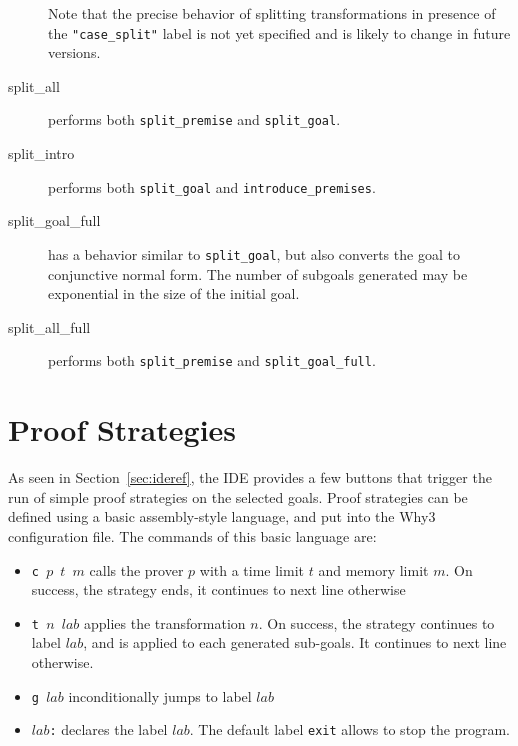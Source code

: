 \begin{description}
Note that the precise behavior of splitting transformations in presence of
the \verb|"case_split"| label is not yet specified
and is likely to change in future versions.


\item[split\_all]
  performs both \texttt{split\_premise} and \texttt{split\_goal}.

\item[split\_intro]
  performs both \texttt{split\_goal} and \texttt{introduce\_premises}.

\item[split\_goal\_full]
  has a behavior similar
  to \texttt{split\_goal}, but also converts the goal to conjunctive normal form.
  The number of subgoals generated may be exponential in the size of the initial goal.

\item[split\_all\_full]
  performs both \texttt{split\_premise} and \texttt{split\_goal\_full}.


\end{description}


\section{Proof Strategies}
\label{sec:strategies}

As seen in Section~\ref{sec:ideref}, the IDE provides a few buttons
that trigger the run of simple proof strategies on the selected goals.
Proof strategies can be defined using a basic assembly-style language,
and put into the Why3 configuration file. The commands of this basic
language are:
\begin{itemize}
\item \texttt{c $p$ $t$ $m$} calls the prover $p$ with a time limit
  $t$ and memory limit $m$. On success, the strategy ends, it
  continues to next line otherwise
\item \texttt{t $n$ $lab$} applies the transformation $n$. On success,
  the strategy continues to label $lab$, and is applied to each
  generated sub-goals.  It continues to next line otherwise.
\item \texttt{g $lab$} inconditionally jumps to label $lab$
\item \texttt{$lab$:} declares the label $lab$. The default label
  \texttt{exit} allows to stop the program.
\end{itemize}

